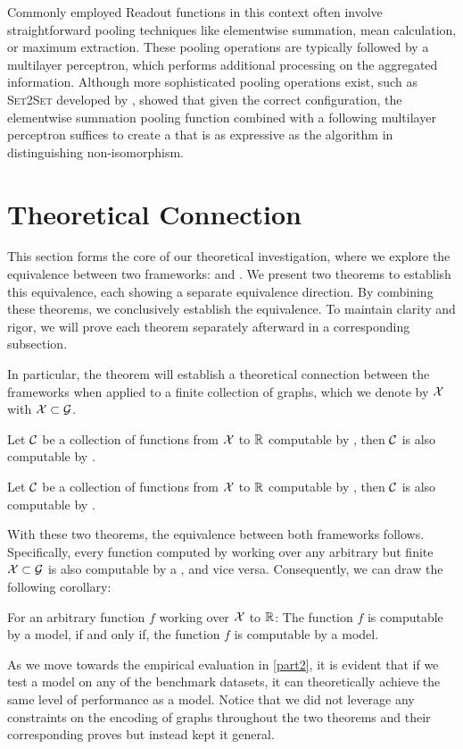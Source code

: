 Commonly employed \textsf{Readout} functions in this context often involve straightforward pooling techniques like elementwise summation, mean calculation, or maximum extraction. These pooling operations are typically followed by a multilayer perceptron, which performs additional processing on the aggregated information. Although more sophisticated pooling operations exist, such as \textsc{Set2Set} developed by \cite{Vinyals2015}, \cite{Xu2018} showed that given the correct configuration, the elementwise summation pooling function combined with a following multilayer perceptron suffices to create a \gnn that is as expressive as the \wl algorithm in distinguishing non-isomorphism.

\section{Theoretical Connection}\label{sec:theo_connections}
This section forms the core of our theoretical investigation, where we explore the equivalence between two frameworks: \wlnn and \gnn. We present two theorems to establish this equivalence, each showing a separate equivalence direction. By combining these theorems, we conclusively establish the equivalence. To maintain clarity and rigor, we will prove each theorem separately afterward in a corresponding subsection.

In particular, the theorem will establish a theoretical connection between the frameworks when applied to a finite collection of graphs, which we denote by $\mathcal{X}$ with $\mathcal{X} \subset \mathcal{G}$.

\begin{theorem}\label{theorem:gnn_in_1wl}
    Let $\mathcal{C}$ be a collection of functions from $\mathcal{X}$ to $\mathbb{R}$ computable by \gnns, then $\mathcal{C}$ is also computable by \wlnn.
\end{theorem}

\begin{theorem}\label{theorem:1wl_in_gnn}
    Let $\mathcal{C}$ be a collection of functions from $\mathcal{X}$ to $\mathbb{R}$ computable by \wlnn, then $\mathcal{C}$ is also computable by \gnns.
\end{theorem}

With these two theorems, the equivalence between both frameworks follows. Specifically, every function computed by \wlnn working over any arbitrary but finite $\mathcal{X} \subset \mathcal{G}$ is also computable by a \gnn, and vice versa. Consequently, we can draw the following corollary:
\begin{corollary}
    For an arbitrary function $f$ working over $\mathcal{X}$ to $\mathbb{R}$: The function $f$ is computable by a \wlnn model, if and only if, the function $f$ is computable by a \gnn model.
\end{corollary}
As we move towards the empirical evaluation in \cref{part2}, it is evident that if we test a \wlnn model on any of the benchmark datasets, it can theoretically achieve the same level of performance as a \gnn model. Notice that we did not leverage any constraints on the encoding of graphs throughout the two theorems and their corresponding proves but instead kept it general.


